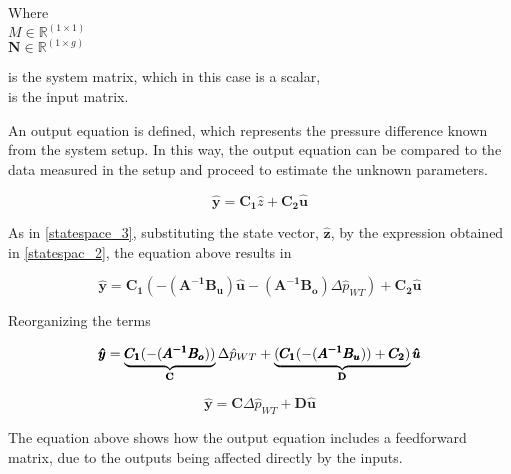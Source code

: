 \begin{minipage}[t]{0.20\textwidth}
Where\\
\hspace*{8mm} $M \in \mathbb{R}^{(1 \times 1)} $ \\
\hspace*{8mm} $\pmb{N} \in \pmb{\mathbb{R}}^{(1 \times g)} $ 
\end{minipage}
\begin{minipage}[t]{0.68\textwidth}
\vspace*{2mm}
is the system matrix, which in this case is a scalar, \\
is the input matrix.
\end{minipage} 


An output equation is defined, which represents the pressure difference known from the system setup. In this way, the output equation can be compared 
to the data measured in the setup and proceed to estimate the unknown parameters. 

\begin{equation}
\pmb{\hat{y}} = \pmb{C_{1}} \hat{z}  + \pmb{C_{2}}\pmb{\hat{u}}  
 \label{statespace_5}
\end{equation}

As in \eqref{statespace_3}, substituting the state vector, $\pmb{\hat{z}}$, by the expression obtained in \eqref{statespac_2}, the equation above results in 

\begin{equation}
\pmb{\hat{y}} = \pmb{C_{1}} (-(\pmb{A^{-1}}\pmb{B_u})\pmb{\hat{u}} - (\pmb{A^{-1}}\pmb{B_o})\Delta \hat{p}_{WT})  + \pmb{C_{2}}\pmb{\hat{u}}  
 \label{statespace_6}
\end{equation}

Reorganizing the terms

\begin{equation}
\pmb{\hat{y}} = \underbrace{\pmb{C_{1}} (-(\pmb{A^{-1}}\pmb{B_o}))}_\text{\pmb{C}} \Delta \hat{p}_{WT} + \underbrace{(\pmb{C_{1}} (-(\pmb{A^{-1}}\pmb{B_u})) + \pmb{C_{2}})}_\text{\pmb{D}}\pmb{\hat{u}}  
 \label{finaloutput}
\end{equation}

\begin{equation}
  \pmb{\hat{y}} = \pmb{C} \Delta \hat{p}_{WT} + \pmb{D} \pmb{\hat{u}} 
\end{equation}

The equation above shows how the output equation includes a feedforward matrix, due to the outputs being affected directly by the inputs.




